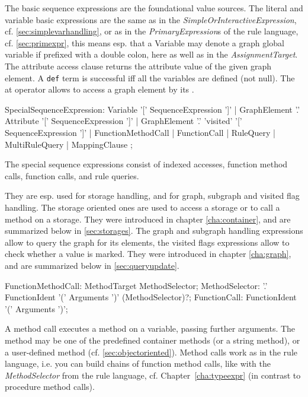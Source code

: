 The basic sequence expressions are the foundational value sources.
The literal and variable basic expressions are the same as in the \emph{SimpleOrInteractiveExpression}, cf. \ref{sec:simplevarhandling}, or as in the \emph{PrimaryExpression}s of the rule language, cf. \ref{sec:primexpr},
this means esp. that a Variable may denote a graph global variable if prefixed with a double colon, here as well as in the \emph{AssignmentTarget}.
The attribute access clause returns the attribute value of the given graph element.
A \texttt{def} term is successful iff all the variables are defined (not null).
The at operator allows to access a graph element by its .

\begin{rail}
  SpecialSequenceExpression:
    Variable '[' SequenceExpression ']' |
    GraphElement '.' Attribute '[' SequenceExpression ']' |
    GraphElement '.' 'visited' '[' SequenceExpression ']' |
    FunctionMethodCall |
    FunctionCall |
    RuleQuery |
    MultiRuleQuery |
    MappingClause
  ;
\end{rail}

The special sequence expressions consist of indexed accesses, function method calls, function calls, and rule queries.

They are esp. used for storage handling, and for graph, subgraph and visited flag handling.
The storage oriented ones are used to access a storage or to call a method on a storage. 
They were introduced in chapter \ref{cha:container}, and are summarized below in \ref{sec:storages}.
The graph and subgraph handling expressions allow to query the graph for its elements, the visited flags expressions allow to check whether a value is marked.
They were introduced in chapter \ref{cha:graph}, and are summarized below in \ref{sec:queryupdate}.

\begin{rail} 
	FunctionMethodCall: MethodTarget MethodSelector;
	MethodSelector: '.' FunctionIdent '(' Arguments ')' (MethodSelector)?;
	FunctionCall: FunctionIdent '(' Arguments ')';
\end{rail}

A method call executes a method on a variable, passing further arguments.
The method may be one of the predefined container methods (or a string method), or a user-defined method (cf. \ref{sec:objectoriented}).
Method calls work as in the rule language, i.e. you can build chains of function method calls, like with the \emph{MethodSelector} from the rule language, cf. Chapter~\ref{cha:typeexpr} (in contrast to procedure method calls).

